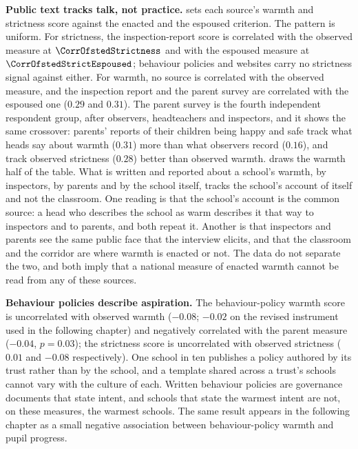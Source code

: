 \textbf{Public text tracks talk, not practice.} 
sets each source's warmth and strictness score against the enacted and the
espoused criterion. The pattern is uniform. For strictness, the
inspection-report score is correlated with the observed measure at
$\CorrOfstedStrictness$ and with the espoused measure at
$\CorrOfstedStrictEspoused$; behaviour policies and websites carry no
strictness signal against either. For warmth, no source is correlated with
the observed measure, and the inspection report and the parent survey are
correlated with the espoused one ($0.29$ and $0.31$). The parent survey is
the fourth independent respondent group, after observers, headteachers and
inspectors, and it shows the same crossover: parents' reports of their
children being happy and safe track what heads say about warmth ($0.31$) more
than what observers record ($0.16$), and track observed strictness ($0.28$)
better than observed warmth.  draws the warmth half
of the table. What is written and reported about a school's warmth, by
inspectors, by parents and by the school itself, tracks the school's account
of itself and not the classroom. One reading is that the school's account is
the common source: a head who describes the school as warm describes it that
way to inspectors and to parents, and both repeat it. Another is that
inspectors and parents see the same public face that the interview elicits,
and that the classroom and the corridor are where warmth is enacted or not.
The data do not separate the two, and both imply that a national measure of
enacted warmth cannot be read from any of these sources.



\textbf{Behaviour policies describe aspiration.} The behaviour-policy warmth
score is uncorrelated with observed warmth ($-0.08$; $-0.02$ on the revised
instrument used in the following chapter) and negatively correlated with the
parent measure ($-0.04$, $p = 0.03$); the strictness score is uncorrelated
with observed strictness ($0.01$ and $-0.08$ respectively). One school in ten
publishes a policy authored by its trust rather than by the school, and a
template shared across a trust's schools cannot vary with the culture of each. Written behaviour policies are governance documents that state
intent, and schools that state the warmest intent are not, on these measures,
the warmest schools. The same result appears in the following chapter as a
small negative association between behaviour-policy warmth and pupil
progress.

